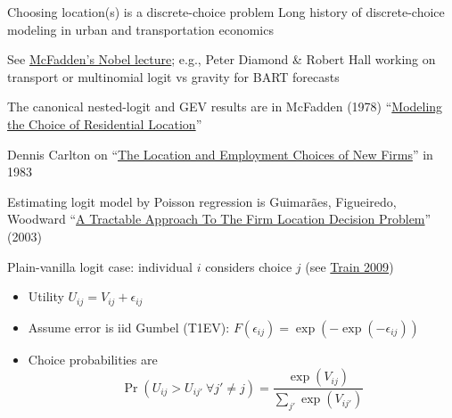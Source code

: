 \documentclass[11pt,notes=hide,aspectratio=169]{beamer}
\begin{document}
\begin{frame}{Choosing location(s) is a discrete-choice problem}
Long history of discrete-choice modeling in urban and transportation economics 
\begin{itemize}{\small 
\item See \href{https://www.nobelprize.org/uploads/2018/06/mcfadden-lecture.pdf}{McFadden's Nobel lecture}; e.g., Peter Diamond \& Robert Hall working on transport or multinomial logit vs gravity for BART forecasts
\item The canonical nested-logit and GEV results are in McFadden (1978) ``\href{https://trid.trb.org/view/87722}{Modeling the Choice of Residential Location}''
\item Dennis Carlton on ``\href{https://www.jstor.org/stable/1924189}{The Location and Employment Choices of New Firms}'' in 1983
\item {Estimating logit model by Poisson regression is Guimar{\~a}es, Figueiredo, Woodward ``\href{https://ideas.repec.org/a/tpr/restat/v85y2003i1p201-204.html}{A Tractable Approach To The Firm Location Decision Problem}'' (2003)\par}
}\end{itemize}
Plain-vanilla logit case:
individual $i$ considers choice $j$ (see \href{https://eml.berkeley.edu/books/choice2.html}{Train 2009})
\begin{itemize}
	\item Utility $U_{ij} = V_{ij} + \epsilon_{ij}$
	\item Assume error is iid Gumbel (T1EV): $F\left(\epsilon_{ij}\right)=\exp(-\exp(-\epsilon_{ij}))$
	\item Choice probabilities are
	\begin{equation*}\Pr(U_{ij}>U_{ij'} \ \forall j' \neq j) = \frac{\exp(V_{ij})}{\sum_{j'}\exp(V_{ij'})} \end{equation*}
\end{itemize}
\end{frame}
\end{document}
